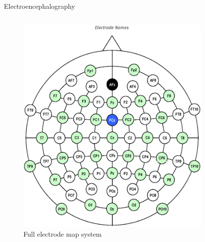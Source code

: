 \documentclass[xcolor=dvipsnames]{beamer} %
\begin{document}
    \begin{frame}{Electroencephalography}
        \begin{columns}
        \begin{column}{0.5\textwidth}
            \begin{figure}
                \centering
                \includegraphics[scale=0.13]{images/EEG_electrodes_map_full.png}
                \caption{Full electrode map system}
                \label{fig:full}
            \end{figure}
        \end{column}
        \pause
        \begin{column}{0.5\textwidth}
            \begin{figure}
                \centering

\end{figure}
\end{column}
\end{columns}
\end{frame}
\end{document}
